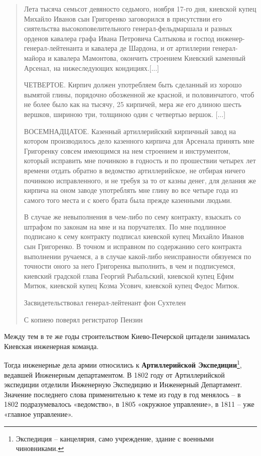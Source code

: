 \begin{quotation}
Лета тысяча семьсот девяносто седьмого, ноября 17-го дня, киевской купец Михайло Иванов сын Григоренко заговорился в присутствии его сиятельства высокоповелительного генерал-фельдмаршала и разных орденов кавалера графа Ивана Петровича Салтыкова и господ инженер-генерал-лейтенанта и кавалера де Шардона, и от артиллерии генерал-майора и кавалера Мамонтова, окончить строением Киевский каменный Арсенал, на нижеследующих кондициях.[...]

ЧЕТВЕРТОЕ. Кирпич должен употребляем быть сделанный из хорошо вымятой глины, порядочно обозженной же красной, и половинчатого, чтоб не более было как на тысячу, 25 кирпичей, мера же его длиною шесть вершков, шириною три, толщиною один с четвертью вершок. [...]

ВОСЕМНАДЦАТОЕ. Казенный артиллерийский кирпичный завод на котором производилось дело казенного кирпича для Арсенала принять мне Григоренку совсем имеющимся на нем строением и инструментом, который исправить мне починкою в годность и по прошествии четырех лет времени отдать обратно в ведомство артиллерийское, не отбирая ничего починкою исправленного, и не требуя за то от казны денег, для делания же кирпича на оном заводе употреблять мне глину во все четыре года из самого того места и с коего брата была прежде казенными людьми.

В случае же невыполнения в чем-либо по сему контракту, взыскать со штрафом по законам на мне и на поручателях. По мне подлинное подписано к сему контракту подписал киевской купец Михайло Иванов сын Григоренко. В точном и исправном по содержанию сего контракта выполнении ручаемся, а в случае какой-либо неисправности обязуемся по точности оного за него Григоренка выполнить, в чем и подписуемся, киевский градской глава Георгий Рыбальский, киевской купец Ефим Митюк, киевской купец Козма Усович, киевской купец Федос Митюк.

Засвидетельствовал генерал-лейтенант фон Сухтелен

С копиею поверял регистратор Пензин
\end{quotation}

Между тем в те же годы строительством Киево-Печер\-ской цитадели занималась Киевская инженерная команда.

Тогда инженерные дела армии относились к \textbf{Артиллерийской Экспедиции}\footnote{Экспедиция – канцелярия, само учреждение, здание с военными чиновниками.}, ведавшей Инженерным департаментом. В 1802 году от Артиллерийской экспедиции отделили Инженерную Экспедицию и Инженерный Департамент. Значение последнего слова применительно к теме из году в год менялось – в 1802 подразумевалось «ведомство», в 1805 «окружное управление», в 1811 – уже «главное управление».

